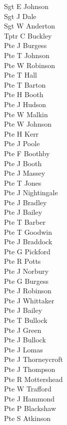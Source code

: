 \begin{multicols}{2}
  \noindent
  Sgt E Johnson \\
  Sgt J Dale \\
  Sgt W Anderton \\
  Tptr C Buckley \\
  Pte J Burgess \\
  Pte T Johnson \\
  Pte W Robinson \\
  Pte T Hall \\
  Pte T Barton \\
  Pte H Booth \\
  Pte J Hudson \\
  Pte W Malkin \\
  Pte W Johnson \\
  Pte H Kerr \\
  Pte J Poole \\
  Pte F Boothby \\
  Pte J Booth \\
  Pte J Massey \\
  Pte T Jones \\
  Pte J Nightingale \\
  Pte J Bradley \\
  Pte J Bailey \\
  Pte T Barber \\
  Pte T Goodwin \\
  Pte J Braddock \\
  Pte G Pickford \\
  Pte R Potts \\
  Pte J Norbury \\
  Pte G Burgess \\
  Pte J Robinson \\
  Pte J Whittaker \\
  Pte J Bailey \\
  Pte T Bullock \\
  Pte J Green \\
  Pte J Bullock \\
  Pte J Lomas \\
  Pte J Thorneycroft \\
  Pte J Thompson \\
  Pte R Mottershead \\
  Pte W Trafford \\
  Pte J Hammond \\
  Pte P Blackshaw \\
  Pte S Atkinson \\

\end{multicols}
